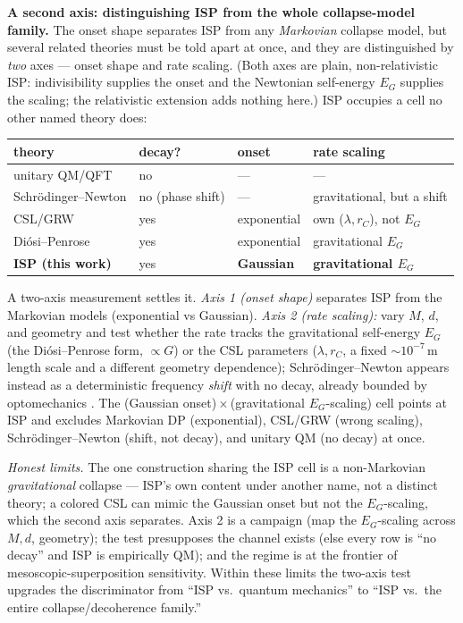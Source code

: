 \documentclass[aps,pra,preprint,amsmath,amssymb,nofootinbib,superscriptaddress]{revtex4-2}
\begin{document}
\medskip\noindent\textbf{A second axis: distinguishing ISP from the whole collapse-model family.}
The onset shape separates ISP from any \emph{Markovian} collapse model, but several related theories
must be told apart at once, and they are distinguished by \emph{two} axes --- onset shape and rate
scaling. (Both axes are plain, non-relativistic ISP: indivisibility supplies the onset and the
Newtonian self-energy $E_G$ supplies the scaling; the relativistic extension adds nothing here.)
ISP occupies a cell no other named theory does:

\begin{table}[h]
\begin{ruledtabular}
\begin{tabular}{llll}
theory & decay? & onset & rate scaling\\
\hline
unitary QM/QFT & no & --- & ---\\
Schr\"odinger--Newton \cite{grossardt2016} & no (phase shift) & --- & gravitational, but a shift\\
CSL/GRW \cite{grw1986,csl1990} & yes & exponential & own ($\lambda,r_C$), not $E_G$\\
Di\'osi--Penrose \cite{penrose1996,diosi1989} & yes & exponential & gravitational $E_G$\\
\textbf{ISP (this work)} & yes & \textbf{Gaussian} & \textbf{gravitational $E_G$}\\
\end{tabular}
\end{ruledtabular}
\end{table}

\noindent A two-axis measurement settles it. \emph{Axis 1 (onset shape)} separates ISP from the
Markovian models (exponential vs Gaussian). \emph{Axis 2 (rate scaling):} vary $M$, $d$, and geometry
and test whether the rate tracks the gravitational self-energy $E_G$ (the Di\'osi--Penrose form,
$\propto G$) or the CSL parameters ($\lambda,r_C$, a fixed $\sim10^{-7}$\,m length scale and a
different geometry dependence); Schr\"odinger--Newton appears instead as a deterministic frequency
\emph{shift} with no decay, already bounded by optomechanics \cite{grossardt2016}. The
(Gaussian onset)\,$\times$\,(gravitational $E_G$-scaling) cell points at ISP and excludes
Markovian DP (exponential), CSL/GRW (wrong scaling), Schr\"odinger--Newton (shift, not decay), and
unitary QM (no decay) at once.

\emph{Honest limits.} The one construction sharing the ISP cell is a non-Markovian \emph{gravitational}
collapse --- ISP's own content under another name, not a distinct theory; a colored CSL
\cite{carlesso2018} can mimic the Gaussian onset but not the $E_G$-scaling, which the second axis
separates. Axis 2 is a campaign (map the $E_G$-scaling across $M,d$, geometry); the test presupposes
the channel exists (else every row is ``no decay'' and ISP is empirically QM); and the regime is at
the frontier of mesoscopic-superposition sensitivity. Within these limits the two-axis test upgrades
the discriminator from ``ISP vs.\ quantum mechanics'' to ``ISP vs.\ the entire collapse/decoherence
family.''
\end{document}
